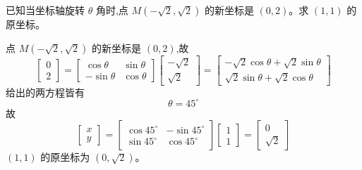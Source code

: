 \begin{questions}
    \question 已知当坐标轴旋转 $\theta$ 角时,点 $M(-\sqrt{2}, \sqrt{2})$ 的新坐标是 $(0, 2)$。求 $(1, 1)$ 的原坐标。
    \begin{solution}
        点 $M(-\sqrt{2}, \sqrt{2})$ 的新坐标是 $(0, 2)$,故
        \[
        \begin{bmatrix} 0 \\ 2 \end{bmatrix} 
        = \begin{bmatrix} \cos\theta & \sin\theta \\ -\sin\theta & \cos\theta \end{bmatrix} \begin{bmatrix} -\sqrt{2} \\ \sqrt{2} \end{bmatrix}= \begin{bmatrix} -\sqrt{2} \cos\theta + \sqrt{2}\sin\theta \\ \sqrt{2}\sin\theta + \sqrt{2}\cos\theta \end{bmatrix}
        \]
        给出的两方程皆有
        \[
        \theta = 45^\circ
        \]
        故
        \[
        \begin{bmatrix} x \\ y \end{bmatrix} 
        = \begin{bmatrix} \cos 45^\circ & -\sin 45^\circ \\ \sin 45^\circ & \cos 45^\circ \end{bmatrix} \begin{bmatrix} 1 \\ 1 \end{bmatrix}
        = \begin{bmatrix} 0 \\ \sqrt{2} \end{bmatrix}
        \]
        $(1, 1)$ 的原坐标为 $(0, \sqrt{2})$。
    \end{solution}


\end{questions}
